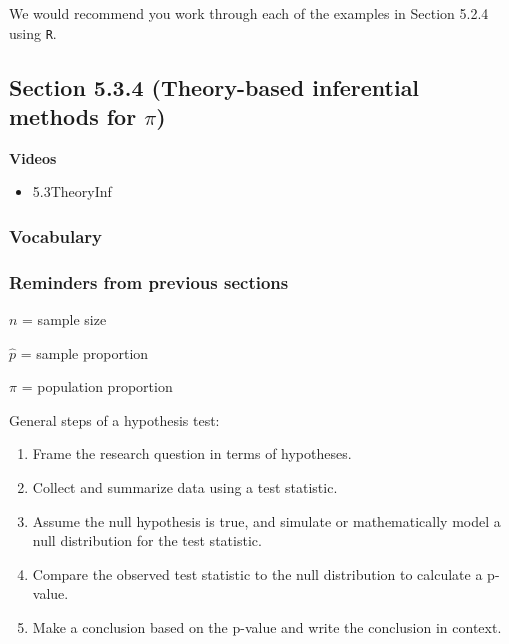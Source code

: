 \documentclass[
]{report}
\providecommand{\tightlist}{%
  \setlength{\itemsep}{0pt}\setlength{\parskip}{0pt}}
\begin{document}
We would recommend you work through each of the examples in Section 5.2.4 using \texttt{R}.

\hypertarget{section-5.3.4-theory-based-inferential-methods-for-pi}{%
\subsection*{\texorpdfstring{Section 5.3.4 (Theory-based inferential methods for \(\pi\))}{Section 5.3.4 (Theory-based inferential methods for \textbackslash pi)}}\label{section-5.3.4-theory-based-inferential-methods-for-pi}}


\textbf{Videos}

\begin{itemize}
\tightlist
\item
  5.3TheoryInf
\end{itemize}


\hypertarget{vocabulary-13}{%
\subsubsection*{Vocabulary}\label{vocabulary-13}}

\hypertarget{reminders-from-previous-sections-1}{%
\subsubsection*{Reminders from previous sections}\label{reminders-from-previous-sections-1}}

\(n\) = sample size

\(\hat{p}\) = sample proportion

\(\pi\) = population proportion

General steps of a hypothesis test:

\begin{enumerate}
\def\labelenumi{\arabic{enumi}.}
\item
  Frame the research question in terms of hypotheses.
\item
  Collect and summarize data using a test statistic.
\item
  Assume the null hypothesis is true, and simulate or mathematically model a null distribution for the test statistic.
\item
  Compare the observed test statistic to the null distribution to calculate a p-value.
\item
  Make a conclusion based on the p-value and write the conclusion in context.
\end{enumerate}
\end{document}
